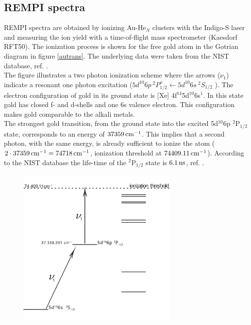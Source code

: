 \documentclass[parskip,12pt,headsepline,a4paper] {scrbook}
\begin{document}
\subsection{REMPI spectra}
\label{chap:aurempi}
\vspace{-1\baselineskip}
REMPI spectra are obtained by ionizing Au-He$_N$ clusters with the Indigo-S laser and measuring the ion yield with a time-of-flight mass spectrometer (Kaesdorf RFT50).
The ionization process is shown for the free gold atom in the Gotrian diagram in figure \ref{autrans}. The underlying data were taken from the NIST database, ref. \cite{nist}. \\
The figure illustrates a two photon ionization scheme where the arrows ($\nu_1$) indicate a resonant one photon excitation ($5d^{10}6p \ ^2P^o_{1/2} \leftarrow 5d^{10}6s \ ^2S_{1/2}$ ). The electron configuration of gold in its ground state is [Xe] 4f$^{14}$5d$^{10}$6s$^1$. In this state gold has closed f- and d-shells and one 6s valence electron. This configuration makes gold comparable to the alkali metals. \\
The strongest gold transition, from the ground state into the excited 5d$^{10}$6p $^2$P$_{1/2}$ state, corresponds to an energy of $\unit[37 359]{cm^{-1}}$. This implies that a second photon, with the same energy, is already sufficient to ionize the atom ($2 \cdot \unit[37 359]{cm^{-1}} = \unit[74 718]{cm^{-1}}$, ionization threshold at $\unit[74 409.11]{cm^{-1}}$). According to the NIST database the life-time of the $^2$P$_{1/2}$ state is $\unit[6.1]{ns}$, ref. \cite{nist}.

\begin{figure}[ht]
\centerline{
\includegraphics[width=8cm]{./results/au_trans_simple.jpg}}
\end{figure}
\end{document}
